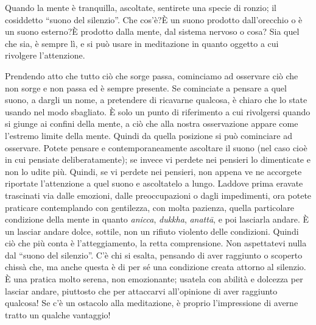 
Quando la mente è tranquilla, ascoltate, sentirete una specie di ronzio;
il cosiddetto ``suono del silenzio''. Che cos'è?È un suono prodotto
dall'orecchio o è un suono esterno?È prodotto dalla mente, dal
sistema nervoso o cosa? Sia quel che sia, è sempre lì, e si può usare in
meditazione in quanto oggetto a cui rivolgere l'attenzione.

Prendendo atto che tutto ciò che sorge passa, cominciamo ad osservare
ciò che non sorge e non passa ed è sempre presente. Se cominciate a
pensare a quel suono, a dargli un nome, a pretendere di ricavarne
qualcosa, è chiaro che lo state usando nel modo sbagliato. È solo un
punto di riferimento a cui rivolgersi quando si giunge ai confini della
mente, a ciò che alla nostra osservazione appare come l'estremo limite
della mente. Quindi da quella posizione si può cominciare ad osservare.
Potete pensare e contemporaneamente ascoltare il suono (nel caso cioè in
cui pensiate deliberatamente); se invece vi perdete nei pensieri lo
dimenticate e non lo udite più. Quindi, se vi perdete nei pensieri, non
appena ve ne accorgete riportate l'attenzione a quel suono e ascoltatelo
a lungo. Laddove prima eravate trascinati via dalle emozioni, dalle
preoccupazioni o dagli impedimenti, ora potete praticare contemplando
con gentilezza, con molta pazienza, quella particolare condizione della
mente in quanto \textit{anicca}, \textit{dukkha}, \textit{anattā}, e poi lasciarla andare. È un
lasciar andare dolce, sottile, non un rifiuto violento delle condizioni.
Quindi ciò che più conta è l'atteggiamento, la retta comprensione. Non
aspettatevi nulla dal ``suono del silenzio''. C'è chi si esalta, pensando
di aver raggiunto o scoperto chissà che, ma anche questa è di per sé una
condizione creata attorno al silenzio. È una pratica molto serena, non
emozionante; usatela con abilità e dolcezza per lasciar andare,
piuttosto che per attaccarvi all'opinione di aver raggiunto qualcosa! Se
c'è un ostacolo alla meditazione, è proprio l'impressione di averne
tratto un qualche vantaggio!

